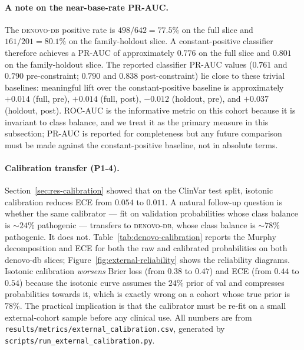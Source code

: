 \documentclass[11pt,a4paper,oneside]{report}
\begin{document}
\paragraph{A note on the near-base-rate PR-AUC.} The
\textsc{denovo-db} positive rate is $498/642 = 77.5\%$ on the full
slice and $161/201 = 80.1\%$ on the family-holdout slice. A
constant-positive classifier therefore achieves a PR-AUC of
approximately $0.776$ on the full slice and $0.801$ on the
family-holdout slice. The reported classifier PR-AUC values
($0.761$ and $0.790$ pre-constraint; $0.790$ and $0.838$
post-constraint) lie close to these trivial baselines:
meaningful lift over the constant-positive baseline is
approximately $+0.014$ (full, pre), $+0.014$ (full, post),
$-0.012$ (holdout, pre), and $+0.037$ (holdout, post). ROC-AUC
is the informative metric on this cohort because it is
invariant to class balance, and we treat it as the primary
measure in this subsection; PR-AUC is reported for completeness
but any future comparison must be made against the
constant-positive baseline, not in absolute terms.

\paragraph{Calibration transfer (P1-4).} Section~\ref{sec:res-calibration}
showed that on the ClinVar test split, isotonic calibration reduces
ECE from $0.054$ to $0.011$. A natural follow-up question is whether
the same calibrator --- fit on validation probabilities whose class
balance is $\sim$$24\%$ pathogenic --- transfers to
\textsc{denovo-db}, whose class balance is $\sim$$78\%$ pathogenic.
It does not. Table~\ref{tab:denovo-calibration} reports the Murphy
decomposition and ECE for both the raw and calibrated probabilities
on both denovo-db slices; Figure~\ref{fig:external-reliability} shows
the reliability diagrams. Isotonic calibration \emph{worsens} Brier
loss (from $0.38$ to $0.47$) and ECE (from $0.44$ to $0.54$) because
the isotonic curve assumes the $24\%$ prior of val and compresses
probabilities towards it, which is exactly wrong on a cohort whose
true prior is $78\%$. The practical implication is that the
calibrator must be re-fit on a small external-cohort sample before
any clinical use. All numbers are from
\texttt{results/metrics/external\_calibration.csv},
generated by \texttt{scripts/run\_external\_calibration.py}.
\end{document}
